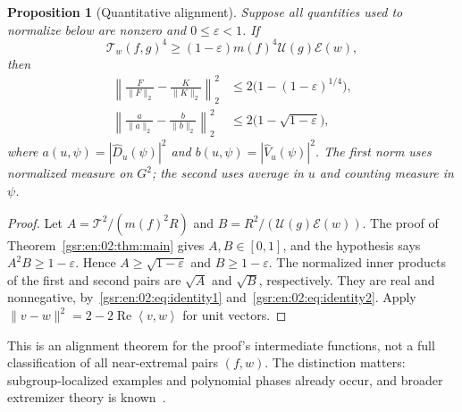\documentclass[11pt,letterpaper]{article}
\numberwithin{equation}{section}
\newtheorem{proposition}[theorem]{Proposition}
\theoremstyle{definition}
\theoremstyle{remark}
\newcommand{\1}{\mathbf 1}
\newcommand{\U}{\mathcal U}
\newcommand{\calE}{\mathcal E}
\newcommand{\calT}{\mathcal T}
\newcommand{\ip}[2]{\left\langle #1,#2\right\rangle}
\DeclareMathOperator{\RePart}{Re}
\begin{document}
\begin{proposition}[Quantitative alignment]\label{gsr:en:02:prop:stability}
Suppose all quantities used to normalize below are nonzero and $0\leq\varepsilon<1$. If
\[
 \calT_w(f,g)^4\geq
 (1-\varepsilon)m(f)^4\U(g)\calE(w),
\]
then
\begin{align*}
 \left\|\frac{F}{\|F\|_2}-\frac{K}{\|K\|_2}\right\|_2^2
 &\leq2\bigl(1-(1-\varepsilon)^{1/4}\bigr),\\
 \left\|\frac{a}{\|a\|_2}-\frac{b}{\|b\|_2}\right\|_2^2
 &\leq2\bigl(1-\sqrt{1-\varepsilon}\bigr),
\end{align*}
where $a(u,\psi)=|\widehat D_u(\psi)|^2$ and
$b(u,\psi)=|\widehat V_u(\psi)|^2$. The first norm uses normalized measure on $G^2$; the second uses average in $u$ and counting measure in $\psi$.
\end{proposition}
\begin{proof}
Let $A=\calT^2/(m(f)^2R)$ and $B=R^2/(\U(g)\calE(w))$. The proof of Theorem~\ref{gsr:en:02:thm:main} gives $A,B\in[0,1]$, and the hypothesis says $A^2B\geq1-\varepsilon$. Hence $A\geq\sqrt{1-\varepsilon}$ and $B\geq1-\varepsilon$. The normalized inner products of the first and second pairs are $\sqrt A$ and $\sqrt B$, respectively. They are real and nonnegative, by~\eqref{gsr:en:02:eq:identity1} and~\eqref{gsr:en:02:eq:identity2}. Apply $\|v-w\|^2=2-2\RePart\ip vw$ for unit vectors.
\end{proof}

This is an alignment theorem for the proof's intermediate functions, not a full classification of all near-extremal pairs $(f,w)$. The distinction matters: subgroup-localized examples and polynomial phases already occur, and broader extremizer theory is known~\cite{eisnertao}.
\end{document}
